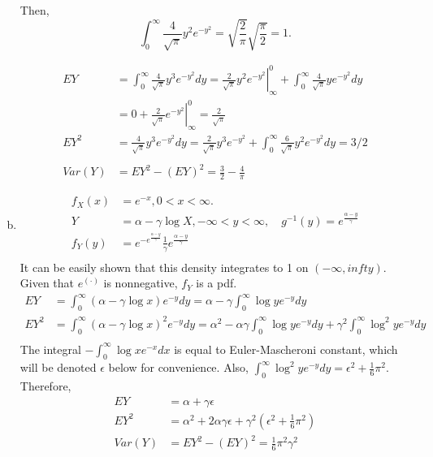 \documentclass[letterpaper]{article}
\newcommand{\intzi}{\int_0^\infty}
\begin{document}
\begin{enumerate}[(a)]
    Then,
    \[
    \intzi \frac{4}{\sqrt{\pi}} y^2 e^{-y^2} = \sqrt{\frac{2}{\pi}} \sqrt{\frac{\pi}{2}} = 1.
    \]

    \begin{align*}
    EY & = \intzi \frac{4}{\sqrt{\pi}} y^3 e^{-y^2} dy = \left. \frac{2}{\sqrt{\pi}} y^2 e^{-y^2} \right|^0_\infty + \intzi \frac{4}{\sqrt{\pi}} y e^{-y^2} dy \\
    & = 0 + \left. \frac{2}{\sqrt{\pi}} e^{-y^2} \right|^0_\infty = \frac{2}{\sqrt{\pi}} \\
    EY^2 & = \frac{4}{\sqrt{\pi}} y^3 e^{-y^2} dy = \frac{2}{\sqrt{\pi}} y^3 e^{-y^2} + \intzi \frac{6}{\sqrt{\pi}} y^2 e^{-y^2}dy = 3/2\\
    \\
    Var(Y) &= EY^2 - (EY)^2 = \frac{3}{2} - \frac{4}{\pi}
    \end{align*}

    \item 
    \begin{align*}
    f_X(x) & = e^{-x}, 0 < x < \infty.\\
    Y & = \alpha - \gamma\log X, -\infty < y < \infty, \quad g^{-1}(y) = e^{\frac{\alpha-y}{\gamma}}\\
    f_Y(y) &= e^{-e^{\frac{\alpha-y}{\gamma}}} \frac{1}{\gamma} e^{\frac{\alpha-y}{\gamma}}\\
    \end{align*}
    It can be easily shown that this density integrates to 1 on $(-\infty, infty)$. Given that $e^(\cdot)$ is nonnegative, $f_Y$ is a pdf.
    \begin{align*}
    EY & = \intzi (\alpha - \gamma \log x) e^{-y} dy = \alpha - \gamma \intzi \log y e^{-y} dy\\
    EY^2 & = \intzi (\alpha - \gamma \log x)^2 e^{-y} dy = \alpha^2 -\alpha \gamma \intzi \log y e^{-y} dy + \gamma^2 \intzi \log^2 y e^{-y} dy \\
    \end{align*}
    The integral $-\intzi \log x e^{-x} dx$ is equal to Euler-Mascheroni constant, which will be denoted $\epsilon$ below for convenience. Also, $\intzi \log^2 y e^{-y} dy = \epsilon^2 + \frac{1}{6} \pi^2.$
    Therefore,
    \begin{align*}
    EY & = \alpha + \gamma \epsilon \\
    EY^2 & = \alpha^2 + 2\alpha\gamma\epsilon + \gamma^2 (\epsilon^2 + \frac{1}{6} \pi^2)\\
    Var(Y) & = EY^2 - (EY)^2 = \frac{1}{6} \pi^2 \gamma^2
    \end{align*}
    \end{enumerate}
\end{document}
